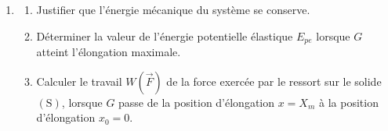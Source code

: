 \begin{enumerate}[resume=x]
    \item[]
    \begin{enumerate}
        \item Justifier que l'énergie mécanique du système se conserve.
        \item Déterminer la valeur de l'énergie potentielle élastique
              $E_{pe}$ lorsque $G$ atteint l'élongation maximale.
        \item Calculer le travail $W(\vec{F})$ de la force exercée par le
              ressort sur le solide $\mathrm{(S)}$, lorsque $G$ passe de
              la position d'élongation $x=X_{m}$ à la position
              d'élongation $x_{0}=0$.
    \end{enumerate}
\end{enumerate}


